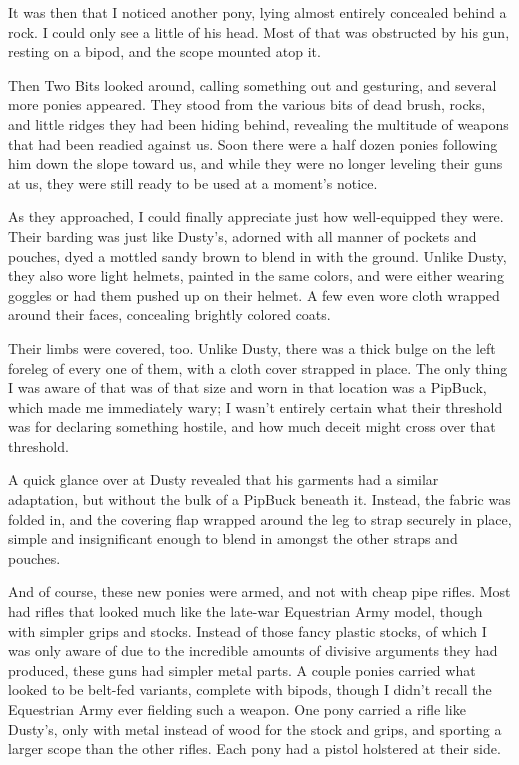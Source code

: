 It was then that I noticed another pony, lying almost entirely concealed behind a rock. I could only see a little of his head. Most of that was obstructed by his gun, resting on a bipod, and the scope mounted atop it.

Then Two Bits looked around, calling something out and gesturing, and several more ponies appeared. They stood from the various bits of dead brush, rocks, and little ridges they had been hiding behind, revealing the multitude of weapons that had been readied against us. Soon there were a half dozen ponies following him down the slope toward us, and while they were no longer leveling their guns at us, they were still ready to be used at a moment’s notice.

As they approached, I could finally appreciate just how well-equipped they were. Their barding was just like Dusty’s, adorned with all manner of pockets and pouches, dyed a mottled sandy brown to blend in with the ground. Unlike Dusty, they also wore light helmets, painted in the same colors, and were either wearing goggles or had them pushed up on their helmet. A few even wore cloth wrapped around their faces, concealing brightly colored coats.

Their limbs were covered, too. Unlike Dusty, there was a thick bulge on the left foreleg of every one of them, with a cloth cover strapped in place. The only thing I was aware of that was of that size and worn in that location was a PipBuck, which made me immediately wary; I wasn’t entirely certain what their threshold was for declaring something hostile, and how much deceit might cross over that threshold.

A quick glance over at Dusty revealed that his garments had a similar adaptation, but without the bulk of a PipBuck beneath it. Instead, the fabric was folded in, and the covering flap wrapped around the leg to strap securely in place, simple and insignificant enough to blend in amongst the other straps and pouches.

And of course, these new ponies were armed, and not with cheap pipe rifles. Most had rifles that looked much like the late-war Equestrian Army model, though with simpler grips and stocks. Instead of those fancy plastic stocks, of which I was only aware of due to the incredible amounts of divisive arguments they had produced, these guns had simpler metal parts. A couple ponies carried what looked to be belt-fed variants, complete with bipods, though I didn’t recall the Equestrian Army ever fielding such a weapon. One pony carried a rifle like Dusty’s, only with metal instead of wood for the stock and grips, and sporting a larger scope than the other rifles. Each pony had a pistol holstered at their side.

